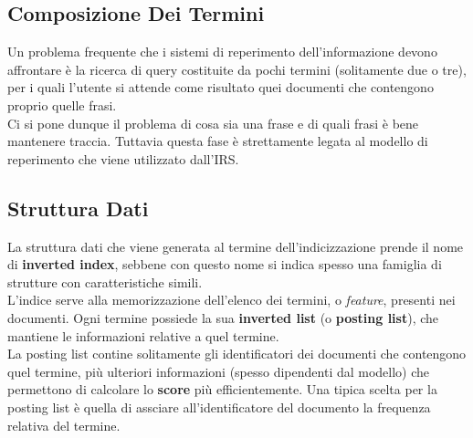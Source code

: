 \documentclass{article}
\begin{document}
\subsection{Composizione Dei Termini}
Un problema frequente che i sistemi di reperimento dell'informazione devono affrontare è la ricerca di query costituite da pochi termini (solitamente due o tre), per i quali l'utente si attende come risultato quei documenti che contengono proprio quelle frasi.\\
Ci si pone dunque il problema di cosa sia una frase e di quali frasi è bene mantenere traccia. Tuttavia questa fase è strettamente legata al modello di reperimento che viene utilizzato dall'IRS.

\subsection{Struttura Dati}
La struttura dati che viene generata al termine dell'indicizzazione prende il nome di \textbf{inverted index}, sebbene con questo nome si indica spesso una famiglia di strutture con caratteristiche simili.\\
L'indice serve alla memorizzazione dell'elenco dei termini, o \textit{feature}, presenti nei documenti. Ogni termine possiede la sua \textbf{inverted list} (o \textbf{posting list}), che mantiene le informazioni relative a quel termine.\\
La posting list contine solitamente gli identificatori dei documenti che contengono quel termine, più ulteriori informazioni (spesso dipendenti dal modello) che permettono di calcolare lo \textbf{score} più efficientemente. Una tipica scelta per la posting list è quella di assciare all'identificatore del documento la frequenza relativa del termine.
\end{document}
